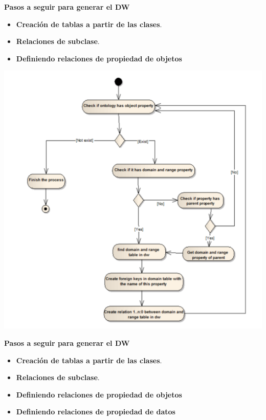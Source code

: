 \documentclass{fancyslides}
\begin{document}
\begin{frame}
\misc
{ \textbf{\Large Pasos a seguir para generar el DW}
\newline
\newline

\begin{itemize}
  \item \textbf{Creación de tablas a partir de las clases}.
  \item \textbf{Relaciones de subclase}.
  \item \textbf{Definiendo relaciones de propiedad de objetos}
\end{itemize}

}
\end{frame}

\begin{frame}
\misc

\begin{center}
\includegraphics[scale=0.15]{object_property}
\end{center}
\end{frame}


\begin{frame}
\misc
{ \textbf{\Large Pasos a seguir para generar el DW}
\newline
\newline

\begin{itemize}
  \item \textbf{Creación de tablas a partir de las clases}.
  \item \textbf{Relaciones de subclase}.
  \item \textbf{Definiendo relaciones de propiedad de objetos}
  \item \textbf{Definiendo relaciones de propiedad de datos}
\end{itemize}

}
\end{frame}
\end{document}
